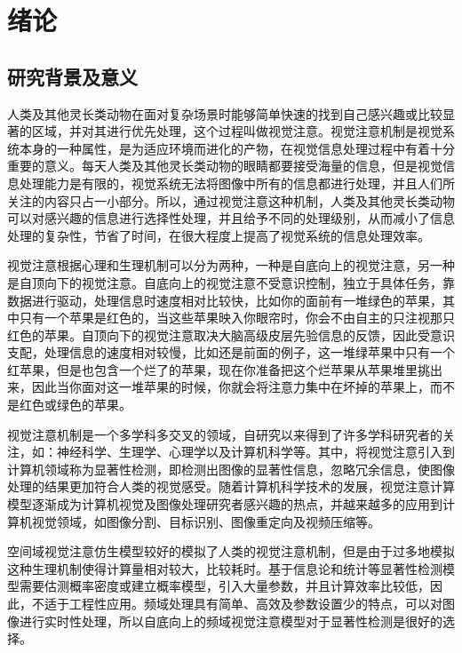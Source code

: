 

\chapter{绪论}
\label{cha1}

\section{研究背景及意义}
\label{1_1}

人类及其他灵长类动物在面对复杂场景时能够简单快速的找到自己感兴趣或比较显著的区域，并对其进行优先处理，这个过程叫做视觉注意。视觉注意机制是视觉系统本身的一种属性，是为适应环境而进化的产物，在视觉信息处理过程中有着十分重要的意义。每天人类及其他灵长类动物的眼睛都要接受海量的信息，但是视觉信息处理能力是有限的，视觉系统无法将图像中所有的信息都进行处理，并且人们所关注的内容只占一小部分。所以，通过视觉注意这种机制，人类及其他灵长类动物可以对感兴趣的信息进行选择性处理，并且给予不同的处理级别，从而减小了信息处理的复杂性，节省了时间，在很大程度上提高了视觉系统的信息处理效率。

视觉注意根据心理和生理机制可以分为两种，一种是自底向上的视觉注意，另一种是自顶向下的视觉注意。自底向上的视觉注意不受意识控制，独立于具体任务，靠数据进行驱动，处理信息时速度相对比较快，比如你的面前有一堆绿色的苹果，其中只有一个苹果是红色的，当这些苹果映入你眼帘时，你会不由自主的只注视那只红色的苹果。自顶向下的视觉注意取决大脑高级皮层先验信息的反馈，因此受意识支配，处理信息的速度相对较慢，比如还是前面的例子，这一堆绿苹果中只有一个红苹果，但是也包含一个烂了的苹果，现在你准备把这个烂苹果从苹果堆里挑出来，因此当你面对这一堆苹果的时候，你就会将注意力集中在坏掉的苹果上，而不是红色或绿色的苹果。

视觉注意机制是一个多学科多交叉的领域，自研究以来得到了许多学科研究者的关注，如：神经科学、生理学、心理学以及计算机科学等。其中，将视觉注意引入到计算机领域称为显著性检测，即检测出图像的显著性信息，忽略冗余信息，使图像处理的结果更加符合人类的视觉感受。随着计算机科学技术的发展，视觉注意计算模型逐渐成为计算机视觉及图像处理研究者感兴趣的热点，并越来越多的应用到计算机视觉领域，如图像分割、目标识别、图像重定向及视频压缩等。

空间域视觉注意仿生模型较好的模拟了人类的视觉注意机制，但是由于过多地模拟这种生理机制使得计算量相对较大，比较耗时。基于信息论和统计等显著性检测模型需要估测概率密度或建立概率模型，引入大量参数，并且计算效率比较低，因此，不适于工程性应用。频域处理具有简单、高效及参数设置少的特点，可以对图像进行实时性处理，所以自底向上的频域视觉注意模型对于显著性检测是很好的选择。

